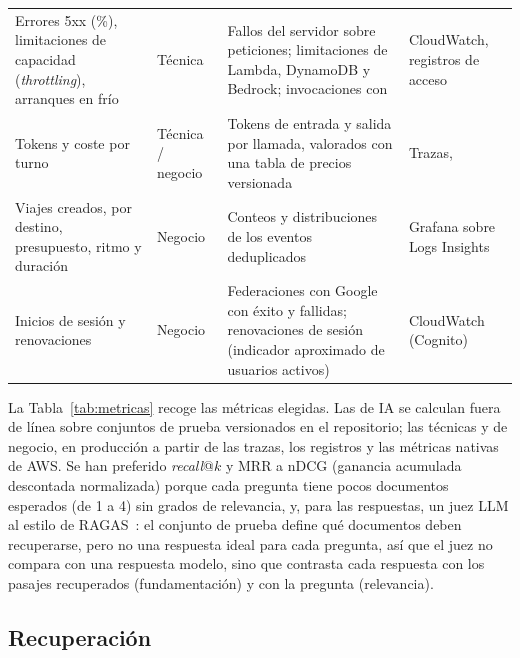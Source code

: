 \begin{table}[t]
\begin{tabularx}{\textwidth}{@{}L{2.55cm}L{0.9cm}YL{3.3cm}@{}}
Errores 5xx (\%), limitaciones de capacidad (\emph{throttling}), arranques en frío & Técnica & Fallos del servidor sobre peticiones; limitaciones de Lambda, DynamoDB y Bedrock; invocaciones con  & CloudWatch, registros de acceso \\
Tokens y coste por turno & Técnica / negocio & Tokens de entrada y salida por llamada, valorados con una tabla de precios versionada & Trazas,  \\
Viajes creados, por destino, presupuesto, ritmo y duración & Negocio & Conteos y distribuciones de los eventos  deduplicados & Grafana sobre Logs Insights \\
Inicios de sesión y renovaciones & Negocio & Federaciones con Google con éxito y fallidas; renovaciones de sesión (indicador aproximado de usuarios activos) & CloudWatch (Cognito) \\
\bottomrule
\end{tabularx}
\end{table}

La Tabla~\ref{tab:metricas} recoge las métricas elegidas. Las de IA se calculan fuera de línea sobre
conjuntos de prueba versionados en el repositorio; las técnicas y de negocio, en producción a partir
de las trazas, los registros y las métricas nativas de AWS. Se han preferido \emph{recall}@$k$ y
MRR a nDCG (ganancia acumulada descontada normalizada) porque cada pregunta tiene pocos documentos esperados (de 1 a 4) sin grados de relevancia, y, para las respuestas, un juez LLM al estilo de
RAGAS~\cite{es2023ragas,zheng2023judge}: el conjunto de prueba define qué documentos deben
recuperarse, pero no una respuesta ideal para cada pregunta, así que el juez no compara con una
respuesta modelo, sino que contrasta cada respuesta con los pasajes recuperados (fundamentación) y
con la pregunta (relevancia).

\subsection{Recuperación}\label{sec:evalrag}

